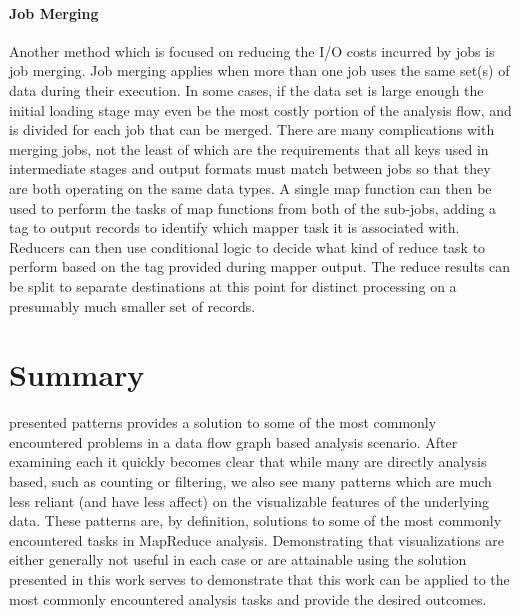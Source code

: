 \paragraph{Job Merging}
Another method which is focused on reducing the I/O costs incurred by jobs is job merging. Job merging applies when more than one job uses the same set(s) of data during their execution. In some cases, if the data set is large enough the initial loading stage may even be the most costly portion of the analysis flow, and is divided for each job that can be merged. There are many complications with merging jobs, not the least of which are the requirements that all keys used in intermediate stages and output formats must match between jobs so that they are both operating on the same data types. A single map function can then be used to perform the tasks of map functions from both of the sub-jobs, adding a tag to output records to identify which mapper task it is associated with. Reducers can then use conditional logic to decide what kind of reduce task to perform based on the tag provided during mapper output. The reduce results can be split to separate destinations at this point for distinct processing on a presumably much smaller set of records.

\section{Summary}
\label{sec:pattern_summary}
 presented patterns provides a solution to some of the most commonly encountered problems in a data flow graph based analysis scenario. After examining each it quickly becomes clear that while many are directly analysis based, such as counting or filtering, we also see many patterns which are much less reliant (and have less affect) on the visualizable features of the underlying data. These patterns are, by definition, solutions to some of the most commonly encountered tasks in MapReduce analysis. Demonstrating that visualizations are either generally not useful in each case or are attainable using the solution presented in this work serves to demonstrate that this work can be applied to the most commonly encountered analysis tasks and provide the desired outcomes. 

